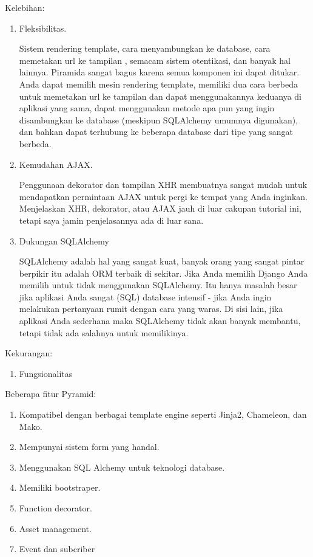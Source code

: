 Kelebihan:
\begin{enumerate}
\item Fleksibilitas.

Sistem rendering template, cara menyambungkan ke database, cara memetakan url ke tampilan , semacam sistem otentikasi, dan banyak hal lainnya. Piramida sangat bagus karena semua komponen ini dapat ditukar. Anda dapat memilih mesin rendering template, memiliki dua cara berbeda untuk memetakan url ke tampilan dan dapat menggunakannya keduanya di aplikasi yang sama, dapat menggunakan metode apa pun yang ingin disambungkan ke database (meskipun SQLAlchemy umumnya digunakan), dan bahkan dapat terhubung ke beberapa database dari tipe yang sangat berbeda.

\item Kemudahan AJAX.

Penggunaan dekorator dan tampilan XHR membuatnya sangat mudah untuk mendapatkan permintaan AJAX untuk pergi ke tempat yang Anda inginkan. Menjelaskan XHR, dekorator, atau AJAX jauh di luar cakupan tutorial ini, tetapi saya jamin penjelasannya ada di luar sana.

\item Dukungan SQLAlchemy

SQLAlchemy adalah hal yang sangat kuat, banyak orang yang sangat pintar berpikir itu adalah ORM terbaik di sekitar. Jika Anda memilih Django Anda memilih untuk tidak menggunakan SQLAlchemy. Itu hanya masalah besar jika aplikasi Anda sangat (SQL) database intensif - jika Anda ingin melakukan pertanyaan rumit dengan cara yang waras. Di sisi lain, jika aplikasi Anda sederhana maka SQLAlchemy tidak akan banyak membantu, tetapi tidak ada salahnya untuk memilikinya.
\end{enumerate}

Kekurangan:
\begin{enumerate}
\item Fungsionalitas
\end{enumerate}

Beberapa fitur Pyramid:
\begin{enumerate}
\item Kompatibel dengan berbagai template engine seperti Jinja2, Chameleon, dan Mako.
\item Mempunyai sistem form yang handal.
\item Menggunakan SQL Alchemy untuk teknologi database.
\item Memiliki bootstraper.
\item Function decorator.
\item Asset management.
\item Event dan subcriber
\end{enumerate}

